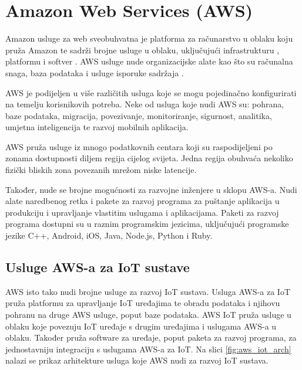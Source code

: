 \chapter{Amazon Web Services (AWS)}

Amazon usluge za web  sveobuhvatna je platforma za računarstvo u oblaku koju pruža Amazon te sadrži brojne usluge u oblaku, uključujući infrastrukturu , platformu  i softver . AWS usluge nude organizacijske alate kao što su računalna snaga, baza podataka i usluge isporuke sadržaja \cite{what_is_aws}. 

AWS je podijeljen u više različitih usluga koje se mogu pojedinačno konfigurirati na temelju korisnikovih potreba. Neke od usluga koje nudi AWS su: pohrana, baze podataka, migracija, povezivanje, monitoriranje, sigurnost, analitika, umjetna inteligencija te razvoj mobilnih aplikacija. 

AWS pruža usluge iz mnogo podatkovnih centara  koji su raspodijeljeni po zonama dostupnosti  diljem regija cijelog svijeta. Jedna regija obuhvaća nekoliko fizički bliskih zona povezanih mrežom niske latencije. 

Također, nude se brojne mogućnosti za razvojne inženjere u sklopu AWS-a. Nudi alate naredbenog retka  i pakete za razvoj programa  za puštanje aplikacija u produkciju  i upravljanje vlastitim uslugama i aplikacijama. Paketi za razvoj programa dostupni su u raznim programskim jezicima, uključujući programske jezike C++, Android, iOS, Java, Node.js, Python i Ruby.
 
\section{Usluge AWS-a za IoT sustave}

AWS isto tako nudi brojne usluge za razvoj IoT sustava. Usluga AWS-a za IoT pruža platformu za upravljanje IoT uređajima te obradu podataka i njihovu pohranu na druge AWS usluge, poput baze podataka. AWS IoT pruža usluge u oblaku koje povezuju IoT uređaje s drugim uređajima i uslugama AWS-a u oblaku. Također pruža software za uređaje, poput paketa za razvoj programa, za jednostavniju integraciju s uslugama AWS-a za IoT. Na slici \ref{fig:aws_iot_arch} nalazi se prikaz arhitekture usluga koje AWS nudi za razvoj IoT sustava.

